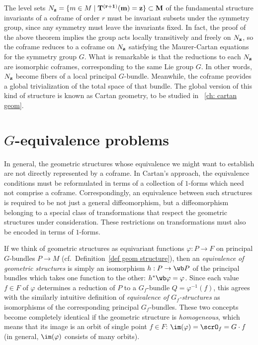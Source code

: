 \begin{rem}
    The level sets $N_{\bf z}=\{m\in M\mid \bf{T}^{(r+1)}(m)=\bf{z}\}\subset M$ of the fundamental structure invariants of a coframe of order $r$ must be invariant subsets under the symmetry group, since any symmetry must leave the invariants fixed. In fact, the proof of the above theorem implies the group acts locally transitively and freely on $N_{\bf z}$, so the coframe reduces to a coframe on $N_{\bf z}$ satisfying the Maurer-Cartan equations for the symmetry group $G$. What is remarkable is that the reductions to each $N_{\bf{z}}$ are isomorphic coframes, corresponding to the same Lie group $G$. In other words, $N_{\bf{z}}$ become fibers of a local principal $G$-bundle. Meanwhile, the coframe provides a global trivialization of the total space of that bundle. The global version of this kind of structure is known as Cartan geometry, to be studied in \Chap~\ref{ch: cartan geom}.
\end{rem}



\section{\texorpdfstring{$G$}{G}-equivalence problems}

In general, the geometric structures whose equivalence we might want to establish are not directly represented by a coframe. In Cartan's approach, the equivalence conditions must be reformulated in terms of a collection of $1$-forms which need not comprise a coframe. Correspondingly, an equivalence between such structures is required to be not just a general diffeomorphism, but a diffeomorphism belonging to a special class of transformations that respect the geometric structures under consideration. These restrictions on transformations must also be encoded in terms of $1$-forms. 

If we think of geometric structures as equivariant functions $\varphi:P\to F$ on principal $G$-bundles $P\to M$ (cf.\ Definition~\ref{def geom structure}), then an \emph{equivalence of geometric structures} is simply an isomorphism $h:P\to \wb P$ of the principal bundles which takes one function to the other: $h^\ast \wb\varphi=\varphi$. Since each value $f\in F$ of $\varphi$ determines a reduction of $P$ to a $G_f$-bundle $Q=\varphi^{-1}(f)$, this agrees with the similarly intuitive definition of \emph{equivalence of $G_f$-structures} as isomorphisms of the corresponding principal $G_f$-bundles. These two concepts become completely identical if the geometric structure is \emph{homogeneous}, which means that its image is an orbit of single point $f\in F$: $\im(\varphi)=\scrO_f=G\cdot f$ (in general, $\im(\varphi)$ consists of many orbits).

